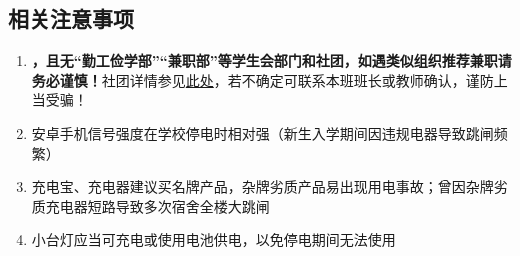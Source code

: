 \subsection[相关注意事项]{相关注意事项}
\begin{enumerate}
    \item \textbf{，且无“勤工俭学部”“兼职部”等学生会部门和社团，如遇类似组织推荐兼职请务必谨慎！}社团详情参见\hyperref[community_summary]{此处}，若不确定可联系本班班长或教师确认，谨防上当受骗！
    \item 安卓手机信号强度在学校停电时相对强（新生入学期间因违规电器导致跳闸频繁）
    \item 充电宝、充电器建议买名牌产品，杂牌劣质产品易出现用电事故；曾因杂牌劣质充电器短路导致多次宿舍全楼大跳闸
    \item 小台灯应当可充电或使用电池供电，以免停电期间无法使用
\end{enumerate}
